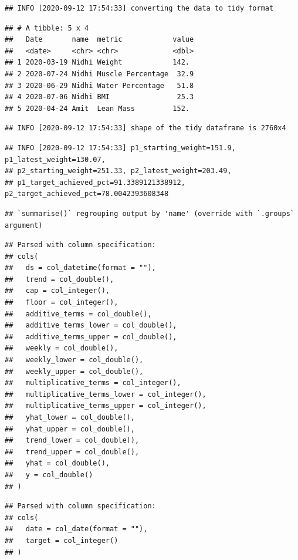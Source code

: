 \documentclass[oneside]{book}
\begin{document}
\begin{verbatim}
## INFO [2020-09-12 17:54:33] converting the data to tidy format
\end{verbatim}

\begin{verbatim}
## # A tibble: 5 x 4
##   Date       name  metric            value
##   <date>     <chr> <chr>             <dbl>
## 1 2020-03-19 Nidhi Weight            142. 
## 2 2020-07-24 Nidhi Muscle Percentage  32.9
## 3 2020-06-29 Nidhi Water Percentage   51.8
## 4 2020-07-06 Nidhi BMI                25.3
## 5 2020-04-24 Amit  Lean Mass         152.
\end{verbatim}

\begin{verbatim}
## INFO [2020-09-12 17:54:33] shape of the tidy dataframe is 2760x4
\end{verbatim}

\begin{verbatim}
## INFO [2020-09-12 17:54:33] p1_starting_weight=151.9, p1_latest_weight=130.07,
## p2_starting_weight=251.33, p2_latest_weight=203.49,
## p1_target_achieved_pct=91.3389121338912, p2_target_achieved_pct=78.0042393608348
\end{verbatim}

\begin{verbatim}
## `summarise()` regrouping output by 'name' (override with `.groups` argument)
\end{verbatim}

\begin{verbatim}
## Parsed with column specification:
## cols(
##   ds = col_datetime(format = ""),
##   trend = col_double(),
##   cap = col_integer(),
##   floor = col_integer(),
##   additive_terms = col_double(),
##   additive_terms_lower = col_double(),
##   additive_terms_upper = col_double(),
##   weekly = col_double(),
##   weekly_lower = col_double(),
##   weekly_upper = col_double(),
##   multiplicative_terms = col_integer(),
##   multiplicative_terms_lower = col_integer(),
##   multiplicative_terms_upper = col_integer(),
##   yhat_lower = col_double(),
##   yhat_upper = col_double(),
##   trend_lower = col_double(),
##   trend_upper = col_double(),
##   yhat = col_double(),
##   y = col_double()
## )
\end{verbatim}

\begin{verbatim}
## Parsed with column specification:
## cols(
##   date = col_date(format = ""),
##   target = col_integer()
## )
\end{verbatim}
\end{document}
